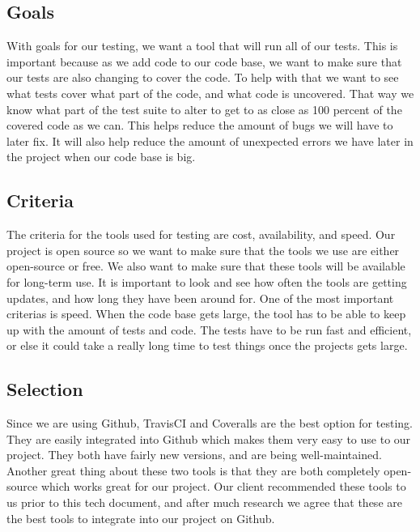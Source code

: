 \documentclass[onecolumn, draftclsnofoot,10pt, compsoc]{IEEEtran}
\begin{document}
\begin{flushleft}
\subsection{Goals}
With goals for our testing, we want a tool that will run all of our tests. This is important because as we add code to our code base, we want to make sure that our tests are also changing to cover the code. To help with that we want to see what tests cover what part of the code, and what code is uncovered. That way we know what part of the test suite to alter to get to as close as 100 percent of the covered code as we can. This helps reduce the amount of bugs we will have to later fix. It will also help reduce the amount of unexpected errors we have later in the project when our code base is big.





\subsection{Criteria}
The criteria for the tools used for testing are cost, availability, and speed. Our project is open source so we want to make sure that the tools we use are either open-source or free. We also want to make sure that these tools will be available for long-term use. It is important to look and see how often the tools are getting updates, and how long they have been around for. One of the most important criterias is speed. When the code base gets large, the tool has to be able to keep up with the amount of tests and code. The tests have to be run fast and efficient, or else it could take a really long time to test things once the projects gets large.





\subsection{Selection}
Since we are using Github, TravisCI and Coveralls are the best option for testing. They are easily integrated into Github which makes them very easy to use to our project. They both have fairly new versions, and are being well-maintained. Another great thing about these two tools is that they are both completely open-source which works great for our project. Our client recommended these tools to us prior to this tech document, and after much research we agree that these are the best tools to integrate into our project on Github.


\end{flushleft}
\end{document}
